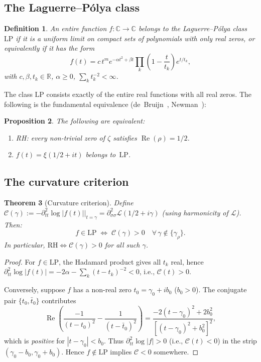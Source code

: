 \documentclass[11pt]{amsart}
\newtheorem{theorem}{Theorem}[section]
\newtheorem{proposition}[theorem]{Proposition}
\newtheorem{definition}[theorem]{Definition}
\renewcommand{\Re}{\operatorname{Re}}
\newcommand{\LP}{\mathrm{LP}}
\begin{document}
\subsection{The Laguerre--P\'olya class}

\begin{definition}
An entire function $f: \mathbb{C} \to \mathbb{C}$ belongs to the
\emph{Laguerre--P\'olya class}~$\LP$ if it is a uniform limit on compact sets of
polynomials with only real zeros, or equivalently if it has the form
\[
  f(t) = c\,t^m e^{-\alpha t^2+\beta t}\prod_k\!\left(1-\frac{t}{t_k}\right)e^{t/t_k},
\]
with $c,\beta,t_k \in \mathbb{R}$, $\alpha \geq 0$, $\sum_k t_k^{-2} < \infty$.
\end{definition}

The class $\LP$ consists exactly of the entire real functions with all real zeros.
The following is the fundamental equivalence (de~Bruijn~\cite{deBruijn1950},
Newman~\cite{Newman1976}):

\begin{proposition}\label{prop:rh-lp}
The following are equivalent:
\begin{enumerate}
  \item[\rm(1)] RH: every non-trivial zero of $\zeta$ satisfies $\Re(\rho) = 1/2$.
  \item[\rm(2)] $f(t) = \xi(1/2+it)$ belongs to~$\LP$.
\end{enumerate}
\end{proposition}

\subsection{The curvature criterion}

\begin{theorem}[Curvature criterion]\label{thm:rh-curvature}
Define $\mathcal{C}(\gamma) := -\partial^2_{tt}\log|f(t)||_{t=\gamma}
= \partial^2_{\sigma\sigma}\mathcal{L}(1/2+i\gamma)$ (using harmonicity of $\mathcal{L}$).
Then:
\[
  f \in \LP
  \;\iff\;
  \mathcal{C}(\gamma) > 0
  \quad\forall\,\gamma \notin \{\gamma_\rho\}.
\]
In particular, $\mathrm{RH} \iff \mathcal{C}(\gamma) > 0$ for all such $\gamma$.
\end{theorem}

\begin{proof}
For $f \in \LP$, the Hadamard product gives all $t_k$ real, hence
$\partial^2_{tt}\log|f(t)| = -2\alpha - \sum_k (t-t_k)^{-2} < 0$,
i.e., $\mathcal{C}(t) > 0$.

Conversely, suppose $f$ has a non-real zero $t_0 = \gamma_0 + ib_0$ ($b_0 > 0$).
The conjugate pair $\{t_0, \bar t_0\}$ contributes
\[
  \Re\!\left(\frac{-1}{(t-t_0)^2} - \frac{1}{(t-\bar t_0)^2}\right)
  = \frac{-2(t-\gamma_0)^2 + 2b_0^2}{[(t-\gamma_0)^2+b_0^2]^2},
\]
which is \emph{positive} for $|t-\gamma_0| < b_0$.  Thus $\partial^2_{tt}\log|f| > 0$
(i.e., $\mathcal{C}(t) < 0$) in the strip $(\gamma_0-b_0, \gamma_0+b_0)$.
Hence $f \notin \LP$ implies $\mathcal{C} < 0$ somewhere.
\end{proof}
\end{document}

